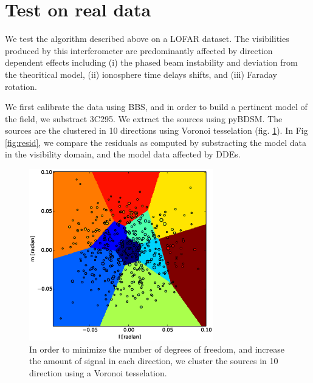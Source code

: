 \section{Test on real data}

We test the algorithm described above on a LOFAR dataset. The
visibilities produced by this interferometer are predominantly
affected by direction dependent effects including (i) the phased beam instability and deviation from the
theoritical model, (ii) ionosphere time delays shifts, and (iii)
Faraday rotation.

We first calibrate the data using BBS, and in order to build a
pertinent model of the field, we substract 3C295. We extract the
sources using pyBDSM. The sources are the clustered in 10 directions using Voronoi
tesselation (fig. \ref{fig:tessel}). In Fig \ref{fig:resid}, we compare the residuals as
computed by substracting the model data in the visibility domain, and
the model data affected by DDEs.




\begin{figure}[]
\begin{center}
\includegraphics[width=8cm]{tessel.eps}
\caption{\label{fig:tessel} In order to minimize the number of degrees
of freedom, and increase the amount of signal in each direction, we cluster the sources in 10 direction using a Voronoi
tesselation.}
\end{center}
\end{figure}


